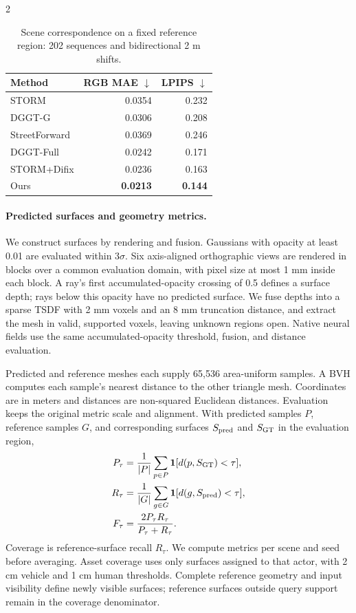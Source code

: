 \begin{multicols}{2}
\begin{table}[H]
\centering\small
\setlength{\tabcolsep}{4pt}
\caption{Scene correspondence on a fixed reference region: 202 sequences and bidirectional 2 m shifts.}
\label{tab:fixed-reference-correspondence}
\begin{tabular}{@{}lrr@{}}
\toprule
Method & RGB MAE $\downarrow$ & LPIPS $\downarrow$ \\
\midrule
STORM & 0.0354 & 0.232 \\
DGGT-G & 0.0306 & 0.208 \\
StreetForward & 0.0369 & 0.246 \\
DGGT-Full & 0.0242 & 0.171 \\
STORM+Difix & 0.0236 & 0.163 \\
Ours & \textbf{0.0213} & \textbf{0.144} \\
\bottomrule
\end{tabular}
\end{table}

\paragraph{Predicted surfaces and geometry metrics.}
We construct surfaces by rendering and fusion. Gaussians with opacity at least 0.01 are evaluated within $3\sigma$. Six axis-aligned orthographic views are rendered in blocks over a common evaluation domain, with pixel size at most 1 mm inside each block. A ray's first accumulated-opacity crossing of 0.5 defines a surface depth; rays below this opacity have no predicted surface. We fuse depths into a sparse TSDF with 2 mm voxels and an 8 mm truncation distance, and extract the mesh in valid, supported voxels, leaving unknown regions open. Native neural fields use the same accumulated-opacity threshold, fusion, and distance evaluation.

Predicted and reference meshes each supply 65,536 area-uniform samples. A BVH computes each sample's nearest distance to the other triangle mesh. Coordinates are in meters and distances are non-squared Euclidean distances. Evaluation keeps the original metric scale and alignment. With predicted samples $P$, reference samples $G$, and corresponding surfaces $S_{\rm pred}$ and $S_{\rm GT}$ in the evaluation region,
\begin{align}
P_\tau&=\frac{1}{|P|}\sum_{p\in P}\mathbf1[d(p,S_{\rm GT})<\tau],\\
R_\tau&=\frac{1}{|G|}\sum_{g\in G}\mathbf1[d(g,S_{\rm pred})<\tau],\\
F_\tau&=\frac{2P_\tau R_\tau}{P_\tau+R_\tau}.
\label{eq:geometry-metrics}
\end{align}
Coverage is reference-surface recall $R_\tau$. We compute metrics per scene and seed before averaging. Asset coverage uses only surfaces assigned to that actor, with 2 cm vehicle and 1 cm human thresholds. Complete reference geometry and input visibility define newly visible surfaces; reference surfaces outside query support remain in the coverage denominator.


\end{multicols}
